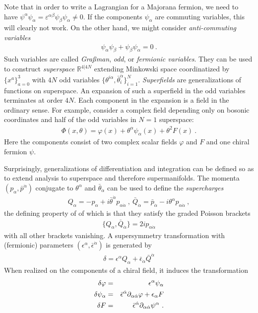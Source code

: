 \documentclass[12pt]{article}
\begin{document}
Note that in order to write a Lagrangian for a Majorana fermion, we need to have $\psi^\alpha \psi_\alpha=\varepsilon^{\alpha \beta}\psi_{\beta}\psi_\alpha \neq0$. If the components $\psi_\alpha$ are commuting variables, this will clearly not work. On the other hand, we might consider {\em anti-commuting variables}
\begin{eqnarray}
\psi_{\alpha} \psi_\beta+ \psi_\beta\psi_{\alpha}=0~.
\end{eqnarray}
Such variables are called {\em Gra\ss man}, {\em odd}, or {\em fermionic variables}. They can be used to construct {\em superspace} $\mathbb R^{4|4N}$ extending Minkowski space coordinatized by $\{x^a\}_{a=0}^3$ with $4N$ odd variables $\{\theta^{i\alpha}, \bar \theta_i^{\dot \alpha}\}_{i=1}^N$. {\em Superfields} are generalizations of functions on superspace. An expansion of such a superfield in the odd variables terminates at order $4N$. Each component in the expansion is a field in the ordinary sense. For example, consider a complex field depending only on bosonic coordinates and half of the odd variables in $N=1$ superspace:
\begin{eqnarray}
\Phi(x, \theta)=\varphi(x)+\theta^\alpha \psi_\alpha(x)+\theta^2 F(x)~.
\end{eqnarray}
Here the components consist of two complex scalar fields $\varphi$ and $F$ and one chiral fermion $\psi$.

Surprisingly, generalizations of differentiation and integration can be defined so as to extend analysis to superspace and therefore supermanifolds. The momenta $(p_\alpha, \bar p^{\dot \alpha})$ conjugate to $\theta^\alpha$ and $\bar \theta_{\dot \alpha}$ can be used to define the {\em supercharges}
\begin{eqnarray}
Q_\alpha=-p_\alpha+i \bar \theta^{\dot \alpha} p_{\alpha \dot \alpha}~,~
\bar Q_{\dot \alpha}=\bar p_{\dot \alpha}-i \theta^{\alpha} p_{\alpha \dot \alpha}~,
\end{eqnarray} 
the defining property of of which is that they satisfy the graded Poisson brackets
\begin{eqnarray}
\{Q_\alpha, \bar Q_{\dot \alpha}\}=2i p_{\alpha\dot \alpha}
\end{eqnarray}
with all other brackets vanishing. A supersymmetry transformation with (fermionic) parameters $(\epsilon^\alpha, \bar \epsilon^{\dot \alpha})$ is generated by 
\begin{eqnarray}
\delta = \epsilon^\alpha Q_\alpha+\bar \epsilon_{\dot \alpha} \bar Q^{\dot \alpha}
\end{eqnarray}
When realized on the components of a chiral field, it induces the transformation
\begin{eqnarray}
\delta \varphi&=&\epsilon^\alpha \psi_\alpha\cr
\delta \psi_\alpha&=&\bar \epsilon^{\dot \alpha}\partial_{\alpha \dot \alpha} \varphi+\epsilon_{\alpha} F\cr
\delta F&=&\bar \epsilon^{\dot \alpha}\partial_{\alpha \dot \alpha} \psi^\alpha~.
\end{eqnarray}
\end{document}
